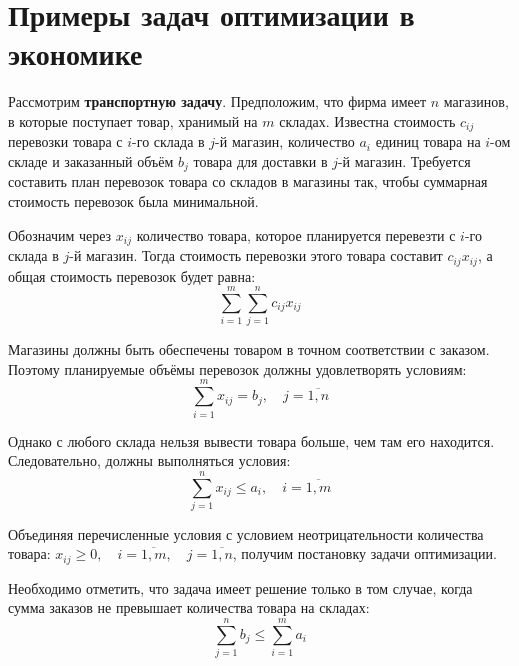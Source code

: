 \documentclass[17pt]{extarticle}
\begin{document}
\section{Примеры задач оптимизации в экономике}

Рассмотрим \textbf{транспортную задачу}. Предположим, что фирма имеет \( n \) магазинов, в которые поступает товар, хранимый на \( m \) складах. Известна стоимость \( c_{ij} \) перевозки товара с \( i \)-го склада в \( j \)-й магазин, количество \( a_i \) единиц товара на \( i \)-ом складе и заказанный объём \( b_j \) товара для доставки в \( j \)-й магазин. Требуется составить план перевозок товара со складов в магазины так, чтобы суммарная стоимость перевозок была минимальной.

Обозначим через \( x_{ij} \) количество товара, которое планируется перевезти с \( i \)-го склада в \( j \)-й магазин. Тогда стоимость перевозки этого товара составит \( c_{ij}x_{ij} \), а общая стоимость перевозок будет равна:
\[
    \sum_{i=1}^m \sum_{j=1}^n c_{ij}x_{ij}
\]

Магазины должны быть обеспечены товаром в точном соответствии с заказом. Поэтому планируемые объёмы перевозок должны удовлетворять условиям:
\[
    \sum_{i=1}^m x_{ij} = b_j, \quad j = \overline{1,n}
\]

Однако с любого склада нельзя вывести товара больше, чем там его находится. Следовательно, должны выполняться условия:
\[
    \sum_{j=1}^n x_{ij} \le a_i, \quad i = \overline{1,m}
\]

Объединяя перечисленные условия с условием неотрицательности количества товара: \( x_{ij} \ge 0, \quad i = \overline{1,m}, \quad j = \overline{1,n} \), получим постановку задачи оптимизации.

Необходимо отметить, что задача имеет решение только в том случае, когда сумма заказов не превышает количества товара на складах:
\[
    \sum_{j=1}^n b_j \le \sum_{i=1}^m a_i
\]
\end{document}
